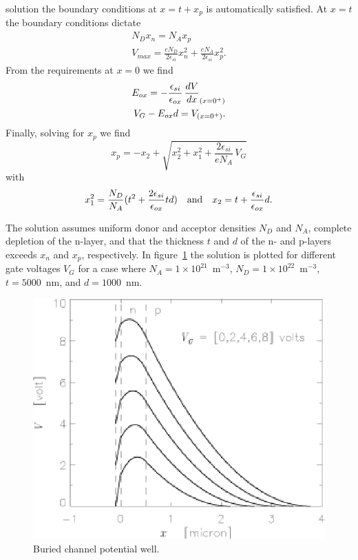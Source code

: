 \documentclass{article}
\begin{document}
solution the boundary conditions at $x = t+x_p$ is automatically satisfied.
At $x = t$ the boundary conditions dictate
\begin{eqnarray}
  N_D x_n = N_A x_p 
	\label{CCD.xn} \\
  V_{max} = \frac{eN_D}{2\epsilon_{si}}x_n^2 +
	\frac{eN_A}{2\epsilon_{si}}x_p^2.
	\label{CCD.Vmax}
\end{eqnarray}
From the requirements at $x = 0$ we find
\begin{eqnarray}
  E_{ox} = - \frac{\epsilon_{si}}{\epsilon_{ox}} \, {d{V}\over{dx}}_{(x=0^+)} \\
  V_G - E_{ox}d = V_{(x=0^+)}.
  \label{CCD.VG}
\end{eqnarray}
Finally, solving for $x_p$ we find
\begin{equation}
  x_p = -x_2+\sqrt{x_2^2+x_1^2+\frac{2\epsilon_{si}}{eN_A} \, V_G}
  \label{CCD.xp}
\end{equation}
with
\begin{equation}
  x_1^2 = \frac{N_D}{N_A}(t^2+\frac{2\epsilon_{si}}{\epsilon_{ox}}td)
  \quad {\rm and} \quad
  x_2 = t+\frac{\epsilon_{si}}{\epsilon_{ox}}d.
  \label{CCD.x12}
\end{equation}

The solution assumes uniform donor and acceptor densities $N_D$ and
$N_A$, complete depletion of the n-layer, and that the thickness $t$
and $d$ of the n- and p-layers exceeds $x_n$ and $x_p$, respectively.
In figure~\ref{CCD.figburchan} the solution is plotted for different
gate voltages $V_G$ for a case where 
$N_A = 1\times 10^{21}$~m$^{-3}$, $N_D = 1\times 10^{22}$~m$^{-3}$, 
$t = 5000$~nm, and $d = 1000$~nm.

\begin{figure}[h]
  \centering
	\includegraphics{CCD_burchan.eps}
  \caption{Buried channel potential well.}
  \label{CCD.figburchan}
\end{figure}
\end{document}
